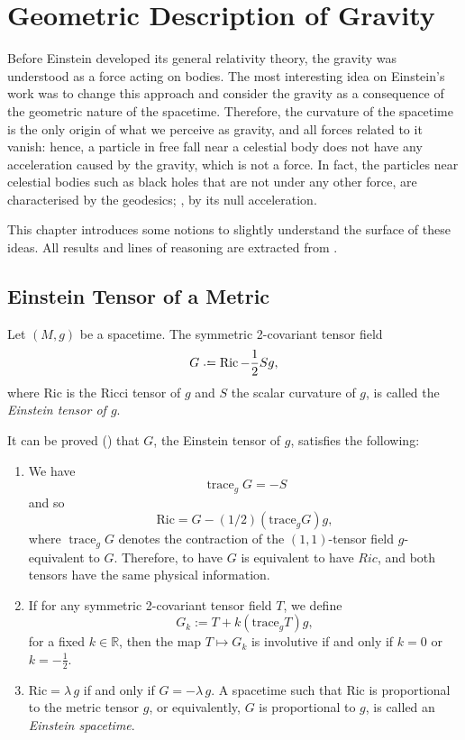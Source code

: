 \chapter{Geometric Description of Gravity}
\label{chapter:einstein}

Before Einstein developed its general relativity theory, the gravity was understood as a force acting on bodies. The most interesting idea on Einstein's work was to change this approach and consider the gravity as a consequence of the geometric nature of the spacetime. Therefore, the curvature of the spacetime is the only origin of what we perceive as gravity, and all forces related to it vanish: hence, a particle in free fall near a celestial body does not have any acceleration caused by the gravity, which is not a force. In fact, the particles near celestial bodies such as black holes that are not under any other force, are characterised by the geodesics; \ie, by its null acceleration.

This chapter introduces some notions to slightly understand the surface of these ideas. All results and lines of reasoning are extracted from \cite[Ch. 4]{sachs77}.

\section{Einstein Tensor of a Metric}

\begin{definition}
	Let $(M,g)$ be a spacetime. The symmetric 2-covariant tensor field
	\[
		G \defeq \operatorname{Ric}-\frac{1}{2}Sg,
	\]
	where Ric is the Ricci tensor of $g$ and $S$ the scalar curvature of $g$, is called the \emph{Einstein tensor of $g$}.
\end{definition}

It can be proved (\cite{sachs77}) that $G$, the Einstein tensor of $g$, satisfies the following:

\begin{enumerate}
	\item We have
	\begin{equation}
		\label{eq:tracegs}
		\operatorname{trace}_gG=-S
	\end{equation}
	and so
	\[
		\mathrm{Ric}=G-(1/2)(\mathrm{trace}_gG)g,
	\] where $\operatorname{trace}_gG$ denotes the contraction of the $(1,1)$-tensor field $g$-equivalent to $G$. Therefore, to have $G$ is equivalent to have $Ric$, and both tensors have the same physical information.
	\item If for any symmetric 2-covariant tensor field $T$, we define \[G_k:=T+k(\mathrm{trace}_gT)g,\] for a fixed $k\in \mathbb{R}$, then the map $T \longmapsto G_k$ is involutive if and only if $k=0$ or $k=-\frac{1}{2}$.
	\item $\mathrm{Ric}=\lambda\,g$ if and only if $G=-\lambda\,g$. A spacetime such that Ric is proportional to the metric tensor $g$, or equivalently, $G$ is proportional to $g$, is called an \emph{Einstein spacetime}.
\end{enumerate}

